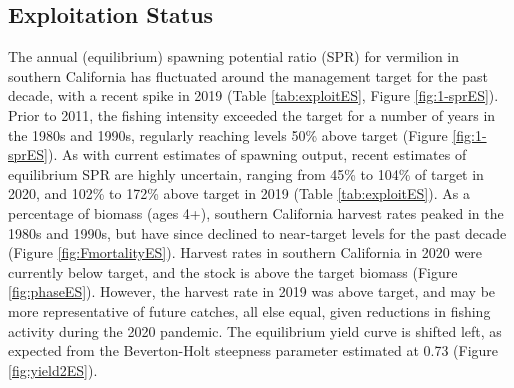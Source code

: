 \documentclass[
  english,
  a4paper,
]{article}
\begin{document}
\hypertarget{exploitation-status}{%
\subsection*{Exploitation Status}\label{exploitation-status}}

The annual (equilibrium) spawning potential ratio (SPR) for vermilion in southern California has fluctuated around the management target for the past decade, with a recent spike in 2019 (Table \ref{tab:exploitES}, Figure \ref{fig:1-sprES}). Prior to 2011, the fishing intensity exceeded the target for a number of years in the 1980s and 1990s, regularly reaching levels 50\% above target (Figure \ref{fig:1-sprES}). As with current estimates of spawning output, recent estimates of equilibrium SPR are highly uncertain, ranging from 45\% to 104\% of target in 2020, and 102\% to 172\% above target in 2019 (Table \ref{tab:exploitES}). As a percentage of biomass (ages 4+), southern California harvest rates peaked in the 1980s and 1990s, but have since declined to near-target levels for the past decade (Figure \ref{fig:FmortalityES}). Harvest rates in southern California in 2020 were currently below target, and the stock is above the target biomass (Figure \ref{fig:phaseES}). However, the harvest rate in 2019 was above target, and may be more representative of future catches, all else equal, given reductions in fishing activity during the 2020 pandemic. The equilibrium yield curve is shifted left, as expected from the Beverton-Holt steepness parameter estimated at 0.73 (Figure \ref{fig:yield2ES}).
\end{document}
